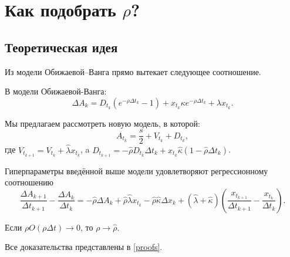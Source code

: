 \section{Как подобрать $\rho$?}
\subsection{Теоретическая идея}

Из модели Обижаевой--Ванга прямо вытекает следующее соотношение.
\begin{lemma}
    В модели Обижаевой-Ванга:
    \begin{equation*}
        \Delta A_k = D_{t_k} (e^{- \rho \Delta t_k} - 1) + x_{t_k} \kappa e^{- \rho \Delta t_k} + \lambda x_{t_k} .
    \end{equation*}
\end{lemma}

Мы предлагаем рассмотреть новую модель, в которой:
\begin{equation*}
        A_{t_k} = \frac{s}{2} + V_{t_k} + D_{t_k},
\end{equation*}
где $V_{t_{k+1}} = V_{t_k} + \hat \lambda x_{t_k}$, a 
$D_{t_{k+1}} = - \hat \rho D_{t_k} \Delta t_k + x_{t_k} \hat \kappa (1 - \hat \rho \Delta t_k)$.


\begin{theorem}
    Гиперпараметры введённой выше
    модели удовлетворяют регрессионному соотношению
    \begin{equation}
        \frac{\Delta A_{k+1}}{\Delta t_{k+1}} - \frac{\Delta A_{k}}{\Delta t_{k}} =
        -\hat \rho \Delta A_k + \hat \rho \hat \lambda x_{t_k} - \hat \rho \hat \kappa \Delta x_k
        + (\hat \lambda + \hat \kappa) \left(\frac{x_{t_{k+1}}}{\Delta t_{k+1}} - \frac{x_{t_k}}{\Delta t_{k}}\right).
    \end{equation}
\end{theorem}

\begin{theorem}
    Если $\rho O(\rho \Delta t) \rightarrow 0$, то $\rho \rightarrow \hat \rho$.
\end{theorem}

  Все доказательства представлены в \ref{proofs}.

